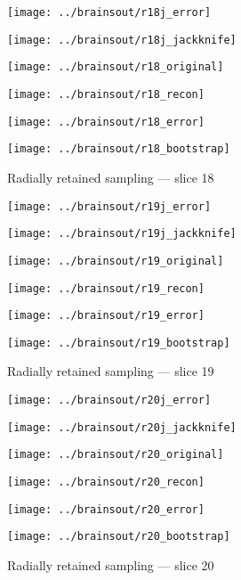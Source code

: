 \documentclass[review,supplement,onefignum,onetabnum,juq]{siamonline181217}
\begin{document}
\begin{figure}
\begin{centering}

\parbox{\imsize}{\texttt{[image: ../brainsout/r18j\_error]}}
\parbox{\imsize}{\texttt{[image: ../brainsout/r18j\_jackknife]}}

\vspace{\vertsep}

\parbox{\imsize}{\texttt{[image: ../brainsout/r18\_original]}}
\parbox{\imsize}{\texttt{[image: ../brainsout/r18\_recon]}}

\vspace{\vertsep}

\parbox{\imsize}{\texttt{[image: ../brainsout/r18\_error]}}
\parbox{\imsize}{\texttt{[image: ../brainsout/r18\_bootstrap]}}

\end{centering}
\caption{Radially retained sampling --- slice 18}
\end{figure}


\begin{figure}
\begin{centering}

\parbox{\imsize}{\texttt{[image: ../brainsout/r19j\_error]}}
\parbox{\imsize}{\texttt{[image: ../brainsout/r19j\_jackknife]}}

\vspace{\vertsep}

\parbox{\imsize}{\texttt{[image: ../brainsout/r19\_original]}}
\parbox{\imsize}{\texttt{[image: ../brainsout/r19\_recon]}}

\vspace{\vertsep}

\parbox{\imsize}{\texttt{[image: ../brainsout/r19\_error]}}
\parbox{\imsize}{\texttt{[image: ../brainsout/r19\_bootstrap]}}

\end{centering}
\caption{Radially retained sampling --- slice 19}
\end{figure}


\begin{figure}
\begin{centering}

\parbox{\imsize}{\texttt{[image: ../brainsout/r20j\_error]}}
\parbox{\imsize}{\texttt{[image: ../brainsout/r20j\_jackknife]}}

\vspace{\vertsep}

\parbox{\imsize}{\texttt{[image: ../brainsout/r20\_original]}}
\parbox{\imsize}{\texttt{[image: ../brainsout/r20\_recon]}}

\vspace{\vertsep}

\parbox{\imsize}{\texttt{[image: ../brainsout/r20\_error]}}
\parbox{\imsize}{\texttt{[image: ../brainsout/r20\_bootstrap]}}

\end{centering}
\caption{Radially retained sampling --- slice 20}
\end{figure}
\end{document}
